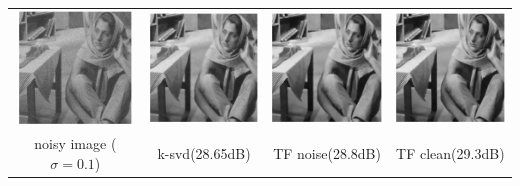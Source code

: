 \documentclass[a4paper]{article}
\begin{document}
\begin{center}
\begin{tabular}{c c c c}
\includegraphics[width=3cm]{./figures/4_1_noise.eps} & \includegraphics[width=3cm]{./figures/4_3_ksvd.eps}
&\includegraphics[width=3cm]{./figures/4_4_tfnoise.eps} & \includegraphics[width=3cm]{./figures/4_5_tfclean.eps}\\
 noisy image ($\sigma=0.1$)& k-svd(28.65dB) &TF noise(28.8dB) & TF clean(29.3dB) 
\end{tabular}
\end{center}
\end{document}
